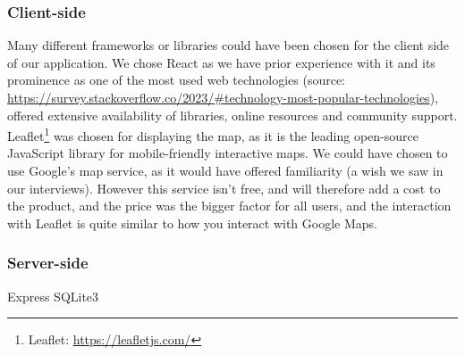 \subsubsection{Client-side}
Many different frameworks or libraries could have been chosen for the client side of our application. We chose React as we have prior experience with it and its prominence as one of the most used web technologies (source: \url{https://survey.stackoverflow.co/2023/#technology-most-popular-technologies}), offered extensive availability of libraries, online resources and community support.
Leaflet\footnote{Leaflet: \url{https://leafletjs.com/}} was chosen for displaying the map, as it is the leading open-source JavaScript library for mobile-friendly interactive maps. We could have chosen to use Google's map service, as it would have offered familiarity (a wish we saw in our interviews). However this service isn't free, and will therefore add a cost to the product, and the price was the bigger factor for all users, and the interaction with Leaflet is quite similar to how you interact with Google Maps.

\subsubsection{Server-side}
Express
SQLite3